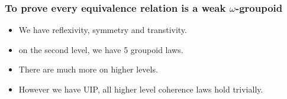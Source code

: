 \documentclass[12pt, mathserif,handout]{beamer}
\begin{document}
\begin{frame}

\frametitle{To prove every equivalence relation is a  weak $\omega$-groupoid}

\begin{itemize}

\item {We have reflexivity, symmetry and transtivity}.

\item {on the second level, we have 5 groupoid laws}.

\item {There are much more on higher levels}.

\item{However we have UIP, all higher level coherence laws hold trivially}.

\end{itemize}

\end{frame}
\end{document}
